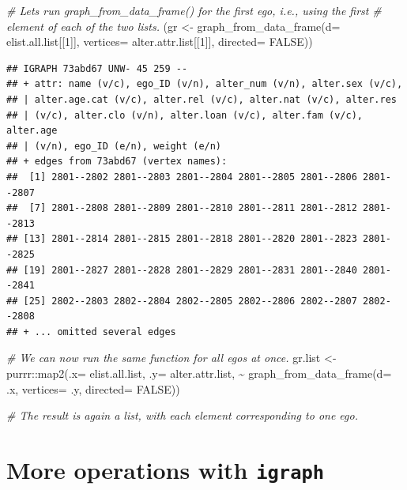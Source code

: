 \documentclass[
]{book}
\newenvironment{Shaded}{\begin{snugshade}}{\end{snugshade}}
\newcommand{\AttributeTok}[1]{\textcolor[rgb]{0.77,0.63,0.00}{#1}}
\newcommand{\CommentTok}[1]{\textcolor[rgb]{0.56,0.35,0.01}{\textit{#1}}}
\newcommand{\ConstantTok}[1]{\textcolor[rgb]{0.00,0.00,0.00}{#1}}
\newcommand{\DecValTok}[1]{\textcolor[rgb]{0.00,0.00,0.81}{#1}}
\newcommand{\FunctionTok}[1]{\textcolor[rgb]{0.00,0.00,0.00}{#1}}
\newcommand{\NormalTok}[1]{#1}
\newcommand{\OtherTok}[1]{\textcolor[rgb]{0.56,0.35,0.01}{#1}}
\newcommand{\SpecialCharTok}[1]{\textcolor[rgb]{0.00,0.00,0.00}{#1}}
\begin{document}
\begin{Shaded}
\begin{Highlighting}[]
\CommentTok{\# Let\textquotesingle{}s run graph\_from\_data\_frame() for the first ego, i.e., using the first}
\CommentTok{\# element of each of the two lists.}
\NormalTok{(gr }\OtherTok{\textless{}{-}} \FunctionTok{graph\_from\_data\_frame}\NormalTok{(}\AttributeTok{d=}\NormalTok{ elist.all.list[[}\DecValTok{1}\NormalTok{]], }
                             \AttributeTok{vertices=}\NormalTok{ alter.attr.list[[}\DecValTok{1}\NormalTok{]], }\AttributeTok{directed=} \ConstantTok{FALSE}\NormalTok{))}
\end{Highlighting}
\end{Shaded}

\begin{verbatim}
## IGRAPH 73abd67 UNW- 45 259 -- 
## + attr: name (v/c), ego_ID (v/n), alter_num (v/n), alter.sex (v/c),
## | alter.age.cat (v/c), alter.rel (v/c), alter.nat (v/c), alter.res
## | (v/c), alter.clo (v/n), alter.loan (v/c), alter.fam (v/c), alter.age
## | (v/n), ego_ID (e/n), weight (e/n)
## + edges from 73abd67 (vertex names):
##  [1] 2801--2802 2801--2803 2801--2804 2801--2805 2801--2806 2801--2807
##  [7] 2801--2808 2801--2809 2801--2810 2801--2811 2801--2812 2801--2813
## [13] 2801--2814 2801--2815 2801--2818 2801--2820 2801--2823 2801--2825
## [19] 2801--2827 2801--2828 2801--2829 2801--2831 2801--2840 2801--2841
## [25] 2802--2803 2802--2804 2802--2805 2802--2806 2802--2807 2802--2808
## + ... omitted several edges
\end{verbatim}

\begin{Shaded}
\begin{Highlighting}[]
\CommentTok{\# We can now run the same function for all egos at once.}
\NormalTok{gr.list }\OtherTok{\textless{}{-}}\NormalTok{ purrr}\SpecialCharTok{::}\FunctionTok{map2}\NormalTok{(}\AttributeTok{.x=}\NormalTok{ elist.all.list, }\AttributeTok{.y=}\NormalTok{ alter.attr.list, }
                       \SpecialCharTok{\textasciitilde{}} \FunctionTok{graph\_from\_data\_frame}\NormalTok{(}\AttributeTok{d=}\NormalTok{ .x, }\AttributeTok{vertices=}\NormalTok{ .y, }\AttributeTok{directed=} \ConstantTok{FALSE}\NormalTok{))}

\CommentTok{\# The result is again a list, with each element corresponding to one ego.}
\end{Highlighting}
\end{Shaded}

\hypertarget{more-igraph}{%
\section{\texorpdfstring{More operations with \texttt{igraph}}{More operations with igraph}}\label{more-igraph}}
\end{document}
